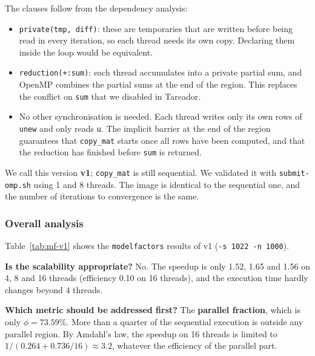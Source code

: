 \documentclass[11pt,a4paper]{article}
\begin{document}
The clauses follow from the dependency analysis:
\begin{itemize}
  \item \texttt{private(tmp, diff)}: these are temporaries that are written before being read in every iteration, so each thread needs its own copy. Declaring them inside the loop would be equivalent.
  \item \texttt{reduction(+:sum)}: each thread accumulates into a private partial sum, and OpenMP combines the partial sums at the end of the region. This replaces the conflict on \texttt{sum} that we disabled in Tareador.
  \item No other synchronisation is needed. Each thread writes only its own rows of \texttt{unew} and only reads \texttt{u}. The implicit barrier at the end of the region guarantees that \texttt{copy\_mat} starts once all rows have been computed, and that the reduction has finished before \texttt{sum} is returned.
\end{itemize}

We call this version \textbf{v1}; \texttt{copy\_mat} is still sequential. We validated it with \texttt{submit-omp.sh} using 1 and 8 threads. The image is identical to the sequential one, and the number of iterations to convergence is the same.

\subsubsection{Overall analysis}

Table~\ref{tab:mf-v1} shows the \texttt{modelfactors} results of v1 (\texttt{-s 1022 -n 1000}).

\begin{table}[H]
\centering
\small

\caption{\texttt{modelfactors} for v1 (parallel \texttt{solve}, sequential \texttt{copy\_mat}).}
\label{tab:mf-v1}
\end{table}

\textbf{Is the scalability appropriate?} No. The speedup is only 1.52, 1.65 and 1.56 on 4, 8 and 16 threads (efficiency 0.10 on 16 threads), and the execution time hardly changes beyond 4 threads.

\textbf{Which metric should be addressed first?} The \textbf{parallel fraction}, which is only $\phi = 73.59\%$. More than a quarter of the sequential execution is outside any parallel region. By Amdahl's law, the speedup on 16 threads is limited to $1/(0.264 + 0.736/16) \approx 3.2$, whatever the efficiency of the parallel part.
\end{document}
